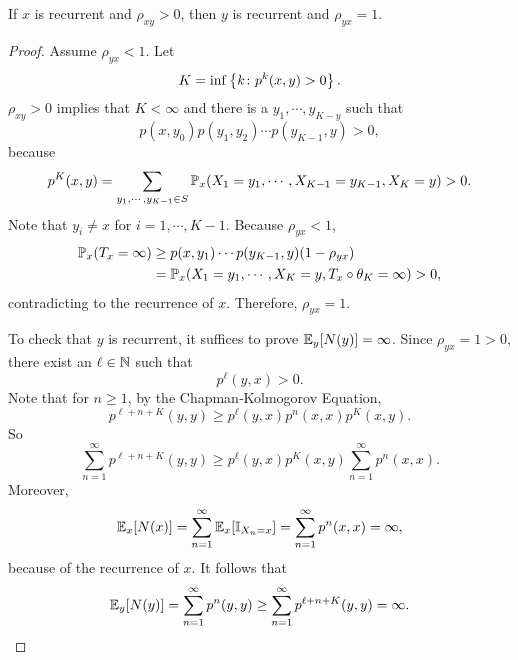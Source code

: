 \begin{thm}
    If $x$ is recurrent and $\rho_{xy} > 0$, then $y$ is recurrent and $\rho_{yx} = 1$.
\end{thm}
\begin{proof}
    Assume $\rho_{yx} < 1$. Let 
    \begin{equation*}
        K = \inf\left\{k \colon p^k(x,y) > 0\right\}.
    \end{equation*}
    $\rho_{xy} > 0$ implies that $K < \infty$ and there is a $y_1,\cdots,y_{K - y}$ such that
    \begin{equation*}
        p(x,y_0)p(y_1,y_2)\cdots p(y_{K-1},y) > 0,
    \end{equation*}
    because
    \begin{equation*}
        p^K(x,y) = \sum_{y_1,\cdots,y_{K-1} \in S} \mathbb{P}_x(X_1 = y_1,\cdots, X_{K-1} = y_{K-1},X_K = y) > 0.
    \end{equation*}
    Note that $y_i \neq x$ for $i=1,\cdots,{K-1}$. Because $\rho_{yx} < 1$, 
    \begin{equation*}
        \begin{aligned}
            \mathbb{P}_x(T_x = \infty) &\geq p(x,y_1)\cdots p(y_{K-1},y)(1-\rho_{yx}) \\
            &= \mathbb{P}_x(X_1=y_1,\cdots, X_K = y, T_x \circ \theta_K = \infty) > 0,
        \end{aligned}
    \end{equation*}
    contradicting to the recurrence of $x$. Therefore, $\rho_{yx} = 1$.

    To check that $y$ is recurrent, it suffices to prove $\mathbb{E}_y[N(y)] = \infty$. Since $\rho_{yx} = 1 > 0$, there exist an $\ell \in \mathbb{N}$ such that
    \begin{equation*}
        p^\ell(y,x) > 0.
    \end{equation*}
    Note that for $n \geq 1$, by the Chapman‑Kolmogorov Equation,
    \begin{equation*}
        p^{\ell + n + K}(y,y) \geq p^\ell(y,x)p^n(x,x)p^K(x,y).
    \end{equation*}
    So
    \begin{equation*}
        \sum_{n=1}^\infty  p^{\ell + n + K}(y,y) \geq p^\ell(y,x)p^K(x,y)\sum_{n=1}^\infty p^n(x,x).
    \end{equation*}
    Moreover,
    \begin{equation*}
        \mathbb{E}_x[N(x)] = \sum_{n=1}^\infty \mathbb{E}_x[\mathbb{I}_{X_n = x}] = \sum_{n=1}^\infty p^n(x,x) = \infty,
    \end{equation*}
    because of the recurrence of $x$. It follows that
    \begin{equation*}
        \mathbb{E}_y[N(y)] = \sum_{n=1}^\infty p^n(y,y) \geq \sum_{n=1}^\infty  p^{\ell + n + K}(y,y) = \infty. \qedhere
    \end{equation*}
\end{proof}

